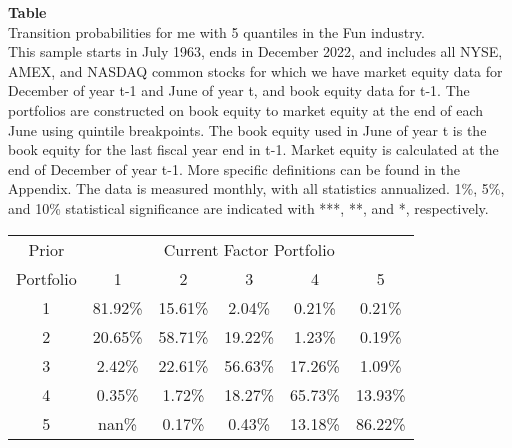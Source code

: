 \begin{table*}[ht!]
\raggedright
{}
\label{tab: transition_probs_me_Fun_with_5_quantiles}
\textbf{Table \thetable} \\
Transition probabilities for me with 5 quantiles in the Fun industry. \\
\hspace*{1em}This sample starts in July 1963, ends in December 2022, and includes all NYSE, AMEX, and NASDAQ common stocks for which we have market equity data for December of year t-1 and June of year t, and book equity data for t-1. The portfolios are constructed on book equity to market equity at the end of each June using quintile breakpoints.  The book equity used in June of year t is the book equity for the last fiscal year end in t-1.  Market equity is calculated at the end of December of year t-1.  More specific definitions can be found in the Appendix.  The data is measured monthly, with all statistics annualized.  1\%, 5\%, and 10\% statistical significance are indicated with ***, **, and *, respectively. \\
\vspace{0.5em}
\centering
\begin{adjustbox}{max width=\textwidth}
\begin{tabular}{@{}cccccc@{}}
\toprule
Prior & \multicolumn{5}{c}{Current Factor Portfolio} \\
Portfolio & 1 & 2 & 3 & 4 & 5 \\
\midrule
1 & 81.92\% & 15.61\% & 2.04\% & 0.21\% & 0.21\% \\
2 & 20.65\% & 58.71\% & 19.22\% & 1.23\% & 0.19\% \\
3 & 2.42\% & 22.61\% & 56.63\% & 17.26\% & 1.09\% \\
4 & 0.35\% & 1.72\% & 18.27\% & 65.73\% & 13.93\% \\
5 & nan\% & 0.17\% & 0.43\% & 13.18\% & 86.22\% \\
\bottomrule
\end{tabular}
\end{adjustbox}
\end{table*}